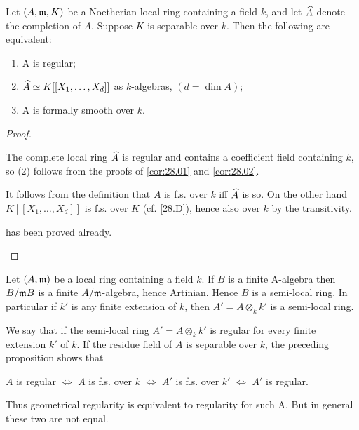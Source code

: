 \documentclass[../main]{subfiles}
\begin{document}
\begin{parproposition}
 Let $(A, \mathfrak{m}, K)$ be a Noetherian local ring containing a field $k$, and let $\widehat{A}$ denote the completion of $A$. Suppose $K$ is separable over $k$. Then the following are equivalent:
 \begin{enumerate}[label = (\arabic*)]
     \item A is regular;
     \item $\widehat{A} \simeq K[[X_1, \dots, X_d]]$ as $k$-algebras, $(d=\dim A)$;
     \item A is formally smooth over $k$.
 \end{enumerate}
\end{parproposition}

\begin{proof}\phantom{,}
\begin{implyenumerate}
    \item[$(1) \implies (2)$] The complete local ring $\widehat{A}$ is regular and contains a coefficient field containing $k$, so (2) follows from the proofs of \ref{cor:28.01} and \ref{cor:28.02}.
    \item[$(2) \implies (3)$] It follows from the definition that $A$ is f.s. over $k$ iff $\widehat{A}$ is so. On the other hand $K[[X_1, \ldots, X_d]]$ is f.s. over $K$ (cf. \ref{28.D}), hence also over $k$ by the transitivity.
    \item[$(3)\implies (1)$] has been proved already.
\end{implyenumerate}
\end{proof}

\newparagraph Let $(A, \mathfrak{m})$ be a local ring containing a field $k$. If $B$ is a finite A-algebra then $B / \mathfrak{m} B$ is a finite $A / \mathfrak{m}$-algebra, hence Artinian. Hence $B$ is a semi-local ring. In particular if $k'$ is any finite extension of $k$, then $A'=A \otimes_k k'$ is a semi-local ring.

We say that  if the semi-local ring $A'=A \otimes_k k'$ is regular for every finite extension $k'$ of $k$. If the residue field of $A$ is separable over $k$, the preceding proposition shows that

$A$ is regular $\iff$ $A$ is f.s. over $k$ $\iff$ $A'$ is f.s. over $k'$ $\iff$ $A'$ is regular.

Thus geometrical regularity is equivalent to regularity for such A. But in general these two are not equal. 
\end{document}
